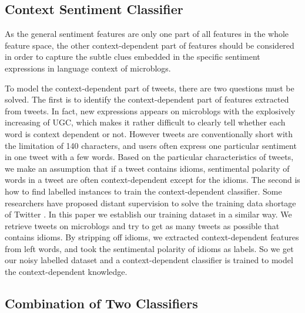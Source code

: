 \documentclass{llncs}
\begin{document}
\subsection{Context Sentiment Classifier}
\label{context}

As the general sentiment features are only one part of all features in the whole feature space, the other context-dependent part of features should be considered in order to capture the subtle clues embedded in the specific sentiment expressions in language context of microblogs.

To model the context-dependent part of tweets, there are two questions must be solved. 
The first is to identify the context-dependent part of features extracted from tweets. 
In fact, new expressions appears on microblogs with the explosively increasing of UGC, which makes it rather difficult to clearly tell whether each word is context dependent or not. 
However tweets are conventionally short with the limitation of 140 characters, and users often express one particular sentiment in one tweet with a few words. 
Based on the particular characteristics of tweets, we make an assumption that if a tweet contains idioms,  sentimental polarity of words in a tweet are often context-dependent except for the idioms. 
The second is how to find labelled instances to train the context-dependent classifier. 
Some researchers have proposed distant supervision to solve the training data shortage of Twitter \cite{xsongx:b36,xsongx:b37}. 
In this paper we establish our training dataset in a similar way.
We retrieve tweets on microblogs and try to get as many tweets as possible that contains idioms. 
By stripping off idioms, we extracted context-dependent features from left words, and took the sentimental polarity of idioms as labels. 
So we get our noisy labelled dataset and a context-dependent classifier is trained to model the context-dependent knowledge.

\subsection{Combination of Two Classifiers}
\label{combination}
\end{document}
